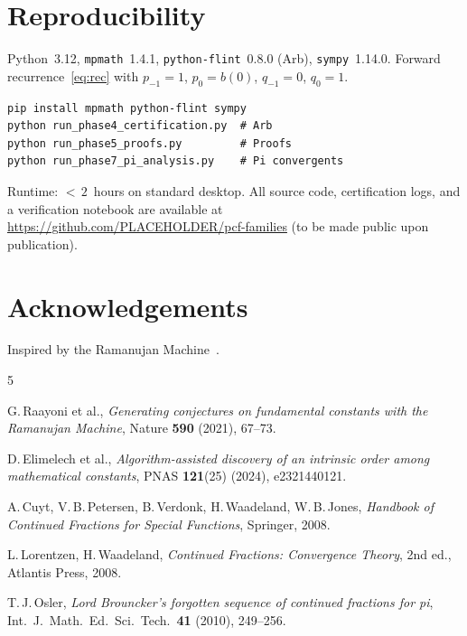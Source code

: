 \documentclass[11pt,a4paper]{article}
\theoremstyle{plain}
\theoremstyle{remark}
\begin{document}
\section{Reproducibility}\label{app:repro}

Python~3.12, \texttt{mpmath}~1.4.1, \texttt{python-flint}~0.8.0 (Arb),
\texttt{sympy}~1.14.0.
Forward recurrence~\eqref{eq:rec} with $p_{-1}{=}1$, $p_0{=}b(0)$,
$q_{-1}{=}0$, $q_0{=}1$.

\begin{verbatim}
pip install mpmath python-flint sympy
python run_phase4_certification.py  # Arb
python run_phase5_proofs.py         # Proofs
python run_phase7_pi_analysis.py    # Pi convergents
\end{verbatim}

\noindent Runtime: ${<}\,2$~hours on standard desktop.
All source code, certification logs, and a verification notebook
are available at \url{https://github.com/PLACEHOLDER/pcf-families}
(to be made public upon publication).

\section*{Acknowledgements}

Inspired by the Ramanujan Machine~\cite{raayoni2021,elimelech2024}.

\begin{thebibliography}{5}

G.\,Raayoni et al.,
\emph{Generating conjectures on fundamental constants with the Ramanujan Machine},
Nature \textbf{590} (2021), 67--73.

D.\,Elimelech et al.,
\emph{Algorithm-assisted discovery of an intrinsic order among mathematical constants},
PNAS \textbf{121}(25) (2024), e2321440121.

A.\,Cuyt, V.\,B.\,Petersen, B.\,Verdonk, H.\,Waadeland, W.\,B.\,Jones,
\emph{Handbook of Continued Fractions for Special Functions},
Springer, 2008.

L.\,Lorentzen, H.\,Waadeland,
\emph{Continued Fractions: Convergence Theory},
2nd ed., Atlantis Press, 2008.

T.\,J.\,Osler,
\emph{Lord Brouncker's forgotten sequence of continued fractions for pi},
Int.\ J.\ Math.\ Ed.\ Sci.\ Tech.\ \textbf{41} (2010), 249--256.

\end{thebibliography}
\end{document}
